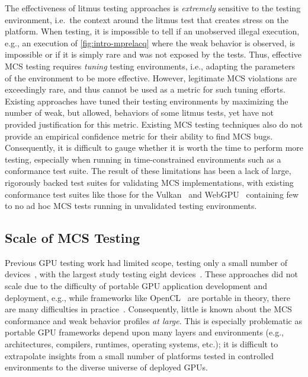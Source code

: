 The effectiveness of litmus testing approaches is \textit{extremely} sensitive to the testing environment, i.e.\ the context around the litmus test that creates stress on the platform. When testing, it is impossible to tell if an unobserved illegal execution, e.g., an execution of \myfig\ref{fig:intro-mprelacq} where the weak behavior is observed, is impossible or if it is simply rare and was not exposed by the tests. Thus, effective MCS testing requires \textit{tuning} testing environments, i.e., adapting the parameters of the environment to be more effective. However, legitimate MCS violations are exceedingly rare, and thus cannot be used as a metric for such tuning efforts. Existing approaches have tuned their testing environments by maximizing the number of weak, but allowed, behaviors of some litmus tests, yet have not provided justification for this metric. Existing MCS testing techniques also do not provide an empirical confidence metric for their ability to find MCS bugs. Consequently, it is difficult to gauge whether it is worth the time to perform more testing, especially when running in time-constrained environments such as a conformance test suite. The result of these limitations has been a lack of large, rigorously backed test suites for validating MCS implementations, with existing conformance test suites like those for the Vulkan~\cite{khronos_vk_gl_cts} and WebGPU~\cite{gpuweb_cts} containing few to no ad hoc MCS tests running in unvalidated testing environments.

\subsection{Scale of MCS Testing}

Previous GPU testing work had limited scope, testing only a small number of devices~\cite{kirkham2020foundations}, with the largest study testing eight devices~\cite{alglave2015gpu}. These approaches did not scale due to the difficulty of portable GPU application development and deployment, e.g., while frameworks like OpenCL~\cite{opencl} are portable in theory, there are many difficulties in practice~\cite{sorensen2016hitchhiker}.  Consequently, little is known about the MCS conformance and weak behavior profiles \emph{at large}.  This is especially problematic as portable GPU frameworks depend upon many layers and environments (e.g., architectures, compilers, runtimes, operating systems, etc.); it is difficult to extrapolate insights from a small number of platforms tested in controlled environments to the diverse universe of deployed GPUs.


